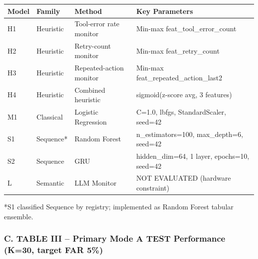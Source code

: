 \documentclass[
]{article}
\newcounter{none} %
\begin{document}
{\def\LTcaptype{none} %
\begin{longtable}[]{@{}
  >{\raggedright\arraybackslash}p{}
  >{\raggedright\arraybackslash}p{}
  >{\raggedright\arraybackslash}p{}
  >{\raggedright\arraybackslash}p{}@{}}
\toprule\noalign{}
\begin{minipage}[b]{\linewidth}\raggedright
Model
\end{minipage} & \begin{minipage}[b]{\linewidth}\raggedright
Family
\end{minipage} & \begin{minipage}[b]{\linewidth}\raggedright
Method
\end{minipage} & \begin{minipage}[b]{\linewidth}\raggedright
Key Parameters
\end{minipage} \\
\midrule\noalign{}
\endhead
\bottomrule\noalign{}
\endlastfoot
H1 & Heuristic & Tool-error rate monitor & Min-max
feat\_tool\_error\_count \\
H2 & Heuristic & Retry-count monitor & Min-max feat\_retry\_count \\
H3 & Heuristic & Repeated-action monitor & Min-max
feat\_repeated\_action\_last2 \\
H4 & Heuristic & Combined heuristic & sigmoid(z-score avg, 3
features) \\
M1 & Classical & Logistic Regression & C=1.0, lbfgs, StandardScaler,
seed=42 \\
S1 & Sequence* & Random Forest & n\_estimators=100, max\_depth=6,
seed=42 \\
S2 & Sequence & GRU & hidden\_dim=64, 1 layer, epochs=10, seed=42 \\
L & Semantic & LLM Monitor & NOT EVALUATED (hardware constraint) \\
\end{longtable}
}

*S1 classified Sequence by registry; implemented as Random Forest
tabular ensemble.

\subsubsection{C. TABLE III -- Primary Mode A TEST Performance (K=30,
target FAR
5\%)}\label{c.-table-iii-primary-mode-a-test-performance-k30-target-far-5}
\end{document}
